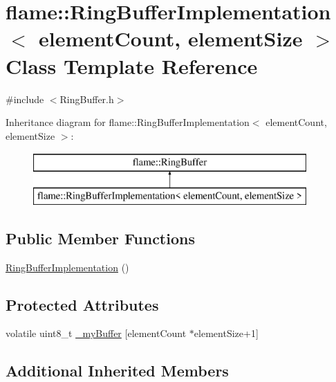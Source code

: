 \hypertarget{classflame_1_1_ring_buffer_implementation}{\section{flame\-:\-:Ring\-Buffer\-Implementation$<$ element\-Count, element\-Size $>$ Class Template Reference}
\label{classflame_1_1_ring_buffer_implementation}
}


{\ttfamily \#include $<$Ring\-Buffer.\-h$>$}

Inheritance diagram for flame\-:\-:Ring\-Buffer\-Implementation$<$ element\-Count, element\-Size $>$\-:\begin{figure}[H]
\begin{center}
\leavevmode
\includegraphics[height=2.000000cm]{classflame_1_1_ring_buffer_implementation}
\end{center}
\end{figure}
\subsection*{Public Member Functions}
\begin{DoxyCompactItemize}
\item 
\hyperlink{classflame_1_1_ring_buffer_implementation_a5a1f27a84989a33d738a53e995bff6dd}{Ring\-Buffer\-Implementation} ()
\end{DoxyCompactItemize}
\subsection*{Protected Attributes}
\begin{DoxyCompactItemize}
\item 
volatile uint8\-\_\-t \hyperlink{classflame_1_1_ring_buffer_implementation_a219b451e18a1e8c7c39e3fc17ae2e64b}{\-\_\-my\-Buffer} \mbox{[}element\-Count $\ast$element\-Size+1\mbox{]}
\end{DoxyCompactItemize}
\subsection*{Additional Inherited Members}


